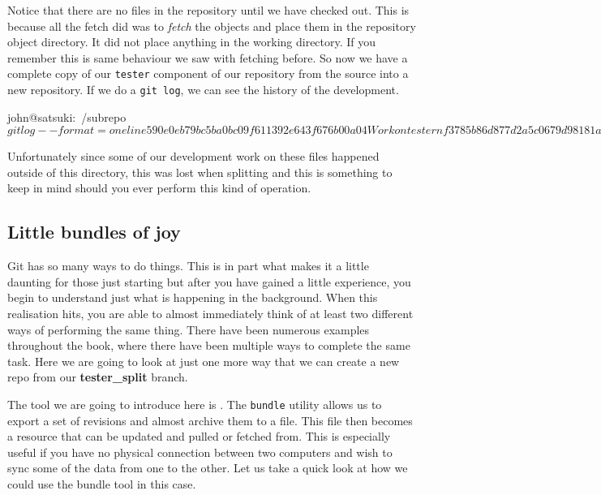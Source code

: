 Notice that there are no files in the repository until we have checked out.
This is because all the fetch did was to \emph{fetch} the objects and place them in the repository object directory.
It did not place anything in the working directory.
If you remember this is same behaviour we saw with fetching before.
So now we have a complete copy of our \texttt{tester} component of our repository from the source into a new repository.
If we do a \texttt{git log}, we can see the history of the development.

\begin{code}
john@satsuki:~/subrepo$ git log --format=oneline
590e0eb79bc5ba0bc09f611392e643f676b00a04 Work on tester nf3
785b86d877d2a5c0679d98181a23d06ed2ba7652 Work on tester nf2
1ff89f787438f081a0d74de2d26eb2d831c9c738 Work on tester nf1
a5a0d9762dd4b50d8f3228e37b315f6056d5a034 Moved testing suite
john@satsuki:~/subrepo$ 
\end{code}

Unfortunately since some of our development work on these files happened outside of this directory,
this was lost when splitting and this is something to keep in mind should you ever perform this kind of operation.

\subsection{Little bundles of joy}
Git has so many ways to do things.
This is in part what makes it a little daunting for those just starting but after you have gained a little experience, you begin to understand just what is happening in the background.
When this realisation hits, you are able to almost immediately think of at least two different ways of performing the same thing.
There have been numerous examples throughout the book, where there have been multiple ways to complete the same task.
Here we are going to look at just one more way that we can create a new repo from our \textbf{tester\_split} branch.

The tool we are going to introduce here is .
The \texttt{bundle} utility allows us to export a set of revisions and almost archive them to a file.
This file then becomes a resource that can be updated and pulled or fetched from.
This is especially useful if you have no physical connection between two computers and wish to sync some of the data from one to the other.
Let us take a quick look at how we could use the bundle tool in this case.

